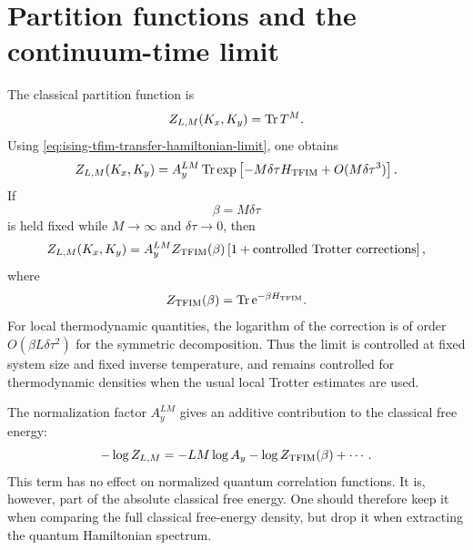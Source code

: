 \section{Partition functions and the continuum-time limit}
\label{sec:ising-tfim-partition-functions}

The classical partition function is
\begin{equation}
\label{eq:ising-tfim-z-tr-tm}
    Z_{L,M}(K_x,K_y)=\operatorname{Tr} T^M .
\end{equation}
Using \cref{eq:ising-tfim-transfer-hamiltonian-limit}, one obtains
\begin{equation}
\label{eq:ising-tfim-z-to-zq-finite-dtau}
    Z_{L,M}(K_x,K_y)
    =
    A_y^{LM}
    \operatorname{Tr}\exp\left[
        -M\delta\tau H_{\rm TFIM}
        +O(M\delta\tau^3)
    \right].
\end{equation}
If
\begin{equation}
\label{eq:ising-tfim-beta-M-dtau}
    \beta=M\delta\tau
\end{equation}
is held fixed while $M\to\infty$ and $\delta\tau\to0$, then
\begin{equation}
\label{eq:ising-tfim-quantum-classical-partition-function}
    Z_{L,M}(K_x,K_y)
    =
    A_y^{LM}
    Z_{\rm TFIM}(\beta)
    \left[1+\text{controlled Trotter corrections}\right],
\end{equation}
where
\begin{equation}
\label{eq:ising-tfim-quantum-partition-function}
    Z_{\rm TFIM}(\beta)=\operatorname{Tr}\mathrm{e}^{-\beta H_{\rm TFIM}} .
\end{equation}
For local thermodynamic quantities, the logarithm of the correction is of order
$O(\beta L\delta\tau^2)$ for the symmetric decomposition.  Thus the limit is
controlled at fixed system size and fixed inverse temperature, and remains
controlled for thermodynamic densities when the usual local Trotter estimates are
used.

The normalization factor $A_y^{LM}$ gives an additive contribution to the
classical free energy:
\begin{equation}
\label{eq:ising-tfim-free-energy-shift}
    -\log Z_{L,M}
    =
    -LM\log A_y
    -\log Z_{\rm TFIM}(\beta)
    +\cdots .
\end{equation}
This term has no effect on normalized quantum correlation functions.  It is,
however, part of the absolute classical free energy.  One should therefore keep
it when comparing the full classical free-energy density, but drop it when
extracting the quantum Hamiltonian spectrum.

